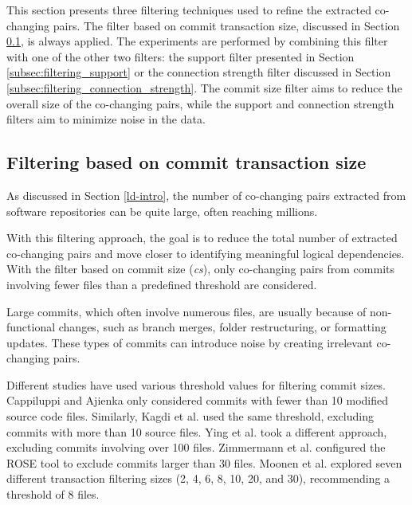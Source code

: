 This section presents three filtering techniques used to refine the extracted co-changing pairs. The filter based on commit transaction size, discussed in Section \ref{subsec:filtering_transaction_size}, is always applied. The experiments are performed by combining this filter with one of the other two filters: the support filter presented in Section \ref{subsec:filtering_support} or the connection strength filter discussed in Section \ref{subsec:filtering_connection_strength}. The commit size filter aims to reduce the overall size of the co-changing pairs, while the support and connection strength filters aim to minimize noise in the data.

\subsection{Filtering based on commit transaction size}
\label{subsec:filtering_transaction_size}

As discussed in Section \ref{ld-intro}, the number of co-changing pairs extracted from software repositories can be quite large, often reaching millions. 

With this filtering approach, the goal is to reduce the total number of extracted co-changing pairs and move closer to identifying meaningful logical dependencies. With the filter based on commit size (\textit{cs}), only co-changing pairs from commits involving fewer files than a predefined threshold are considered.

Large commits, which often involve numerous files, are usually because of non-functional changes, such as branch merges, folder restructuring, or formatting updates. These types of commits can introduce noise by creating irrelevant co-changing pairs.

Different studies have used various threshold values for filtering commit sizes. Cappiluppi and Ajienka \cite{DBLP:journals/jss/AjienkaC17, DBLP:journals/ese/AjienkaCC18} only considered commits with fewer than 10 modified source code files. Similarly, Kagdi et al. used the same threshold, excluding commits with more than 10 source files. Ying et al. \cite{Ying-co-change} took a different approach, excluding commits involving over 100 files. Zimmermann et al. \cite{Zimmermann:2004:MVH:998675.999460} configured the ROSE tool to exclude commits larger than 30 files. Moonen et al. \cite{Moonen-commit} explored seven different transaction filtering sizes (2, 4, 6, 8, 10, 20, and 30), recommending a threshold of 8 files.



